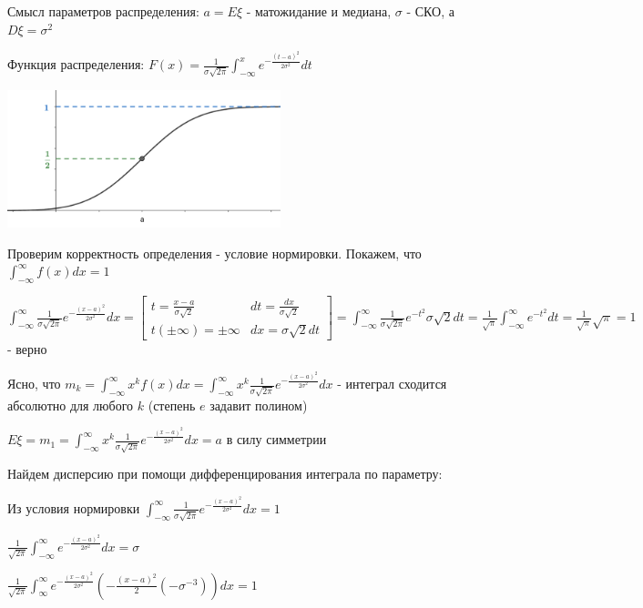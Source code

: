 \documentclass[12pt]{article}
\begin{document}
    Смысл параметров распределения: $a = E\xi$ - матожидание и медиана, $\sigma$ - СКО, а $D\xi = \sigma^2$

    Функция распределения: $F(x) = \frac{1}{\sigma \sqrt{2\pi}} \int_{-\infty}^x e^{-\frac{(t - a)^2}{2\sigma^2}} dt$

    \includegraphics[height=4cm]{probtheory/images/probtheory_2024_10_29_6}

    Проверим корректность определения - условие нормировки. Покажем, что $\int_{-\infty}^\infty f(x)dx = 1$

    $\int_{-\infty}^\infty \frac{1}{\sigma \sqrt{2\pi}} e^{-\frac{(x - a)^2}{2\sigma^2}} dx = \left[\begin{matrix}t = \frac{x - a}{\sigma \sqrt{2}} & dt = \frac{dx}{\sigma\sqrt{2}} \\ t (\pm \infty) = \pm \infty & dx = \sigma\sqrt{2}dt\end{matrix}\right] = 
    \int_{-\infty}^\infty \frac{1}{\sigma\sqrt{2\pi}} e^{-t^2} \sigma\sqrt{2} dt = \frac{1}{\sqrt{\pi}} \int_{-\infty}^{\infty} e^{-t^2} dt = \frac{1}{\sqrt{\pi}} \sqrt{\pi} = 1$ - верно

    Ясно, что $m_k = \int_{-\infty}^\infty x^k f(x) dx = \int_{-\infty}^\infty x^k \frac{1}{\sigma \sqrt{2\pi}} e^{-\frac{(x - a)^2}{2\sigma^2}} dx$ - интеграл сходится абсолютно для любого $k$ (степень $e$ задавит полином)

    $E\xi = m_1 = \int_{-\infty}^\infty x^k \frac{1}{\sigma \sqrt{2\pi}} e^{-\frac{(x - a)^2}{2\sigma^2}} dx = a$ в силу симметрии

    Найдем дисперсию при помощи дифференцирования интеграла по параметру: 
    
    Из условия нормировки $\int_{-\infty}^\infty \frac{1}{\sigma \sqrt{2\pi}} e^{-\frac{(x - a)^2}{2\sigma^2}} dx = 1$

    $\frac{1}{\sqrt{2\pi}} \int_{-\infty}^\infty e^{-\frac{(x - a)^2}{2\sigma^2}} dx = \sigma$
    
    $\frac{1}{\sqrt{2\pi}} \int_{\infty}^\infty e^{-\frac{(x - a)^2}{2\sigma^2}} \left(-\frac{(x - a)^2}{2} (-\sigma^{-3})\right) dx = 1$
    
\end{document}
